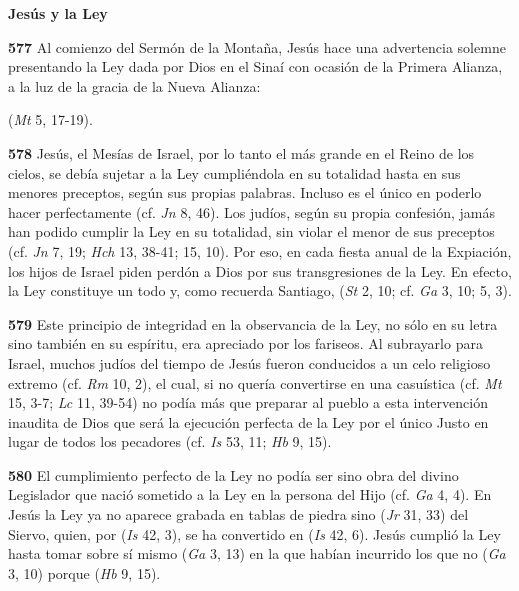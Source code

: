 \textbf{Jesús y la Ley}

\textbf{577} Al comienzo del Sermón de la Montaña, Jesús hace una advertencia solemne presentando la Ley dada por Dios en el Sinaí con ocasión de la Primera Alianza, a la luz de la gracia de la Nueva Alianza:

 (\emph{Mt} 5, 17-19).

\textbf{578} Jesús, el Mesías de Israel, por lo tanto el más grande en el Reino de los cielos, se debía sujetar a la Ley cumpliéndola en su totalidad hasta en sus menores preceptos, según sus propias palabras. Incluso es el único en poderlo hacer perfectamente (cf. \emph{Jn} 8, 46). Los judíos, según su propia confesión, jamás han podido cumplir la Ley en su totalidad, sin violar el menor de sus preceptos (cf. \emph{Jn} 7, 19; \emph{Hch} 13, 38-41; 15, 10). Por eso, en cada fiesta anual de la Expiación, los hijos de Israel piden perdón a Dios por sus transgresiones de la Ley. En efecto, la Ley constituye un todo y, como recuerda Santiago,  (\emph{St} 2, 10; cf. \emph{Ga} 3, 10; 5, 3).

\textbf{579} Este principio de integridad en la observancia de la Ley, no sólo en su letra sino también en su espíritu, era apreciado por los fariseos. Al subrayarlo para Israel, muchos judíos del tiempo de Jesús fueron conducidos a un celo religioso extremo (cf. \emph{Rm} 10, 2), el cual, si no quería convertirse en una casuística  (cf. \emph{Mt} 15, 3-7; \emph{Lc} 11, 39-54) no podía más que preparar al pueblo a esta intervención inaudita de Dios que será la ejecución perfecta de la Ley por el único Justo en lugar de todos los pecadores (cf. \emph{Is} 53, 11; \emph{Hb} 9, 15).

\textbf{580} El cumplimiento perfecto de la Ley no podía ser sino obra del divino Legislador que nació sometido a la Ley en la persona del Hijo (cf. \emph{Ga} 4, 4). En Jesús la Ley ya no aparece grabada en tablas de piedra sino  (\emph{Jr} 31, 33) del Siervo, quien, por  (\emph{Is} 42, 3), se ha convertido en  (\emph{Is} 42, 6). Jesús cumplió la Ley hasta tomar sobre sí mismo  (\emph{Ga} 3, 13) en la que habían incurrido los que no  (\emph{Ga} 3, 10) porque  (\emph{Hb} 9, 15).

